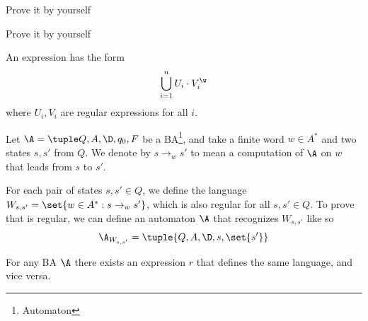 \documentclass[oneside]{academica}
\begin{document}
\begin{proof*}
  Prove it by yourself
\end{proof*}

\begin{proof*}
  Prove it by yourself
\end{proof*}

\begin{definition*}
  An \wreg expression has the form
  \begin{equation*}
    \bigcup_{i=1}^n U_i \cdot V_i^\w
  \end{equation*}
  where $U_i, V_i$ are regular expressions for all $i$.
\end{definition*}
Let $\A = \NBA$ be a BA\footnote{\Buchi Automaton}, and take a finite word $w \in A^*$ and two states $s, s'$ from $Q$.
We denote by $s \to_w s'$ to mean a computation of $\A$ on $w$ that leads from $s$ to $s'$.

For each pair of states $s, s' \in Q$, we define the language $W_{s,s'} = \set{w \in A^* : s \to_w s'}$, which is also regular for all $s, s' \in Q$.
To prove that is regular, we can define an automaton $\A$ that recognizes $W_{s,s'}$ like so
\begin{equation*}
  \A_{W_{s,s'}} = \tuple{Q, A, \D, s, \set{ s'}}
\end{equation*}

\begin{theorem*}
  For any BA $\A$ there exists an \wreg expression $r$ that defines the same language, and vice versa.
\end{theorem*}
\end{document}
